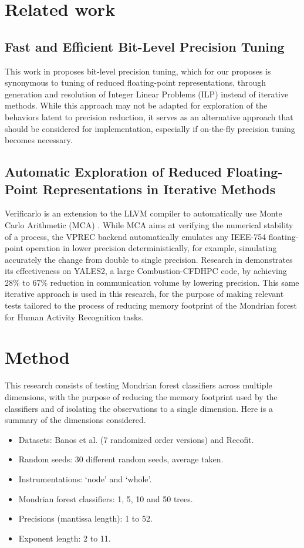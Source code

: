 \documentclass[conference]{IEEEtran}
\begin{document}
\section{Related work}
\subsection{Fast and Efficient Bit-Level Precision Tuning}
This work in \cite{adje2021fast} proposes bit-level precision tuning, which for our proposes is synonymous to tuning of reduced floating-point representations, through generation and resolution of Integer Linear Problems (ILP) instead of iterative methods. While this approach may not be adapted for exploration of the behaviors latent to precision reduction, it serves as an alternative approach that should be considered for implementation, especially if on-the-fly precision tuning becomes necessary.
\subsection{Automatic Exploration of Reduced Floating-Point Representations in Iterative Methods}
Verificarlo is an extension to the LLVM compiler to automatically use Monte Carlo Arithmetic (MCA) \cite{denis2016verificarlo}. While MCA aims at verifying the numerical stability of a process, the VPREC backend automatically emulates any IEEE-754 floating-point operation in lower precision deterministically, for example, simulating accurately the change from double to single precision. Research in \cite{chatelain2019automatic} demonstrates its effectiveness on YALES2, a large Combustion-CFDHPC code, by achieving 28\% to 67\% reduction in communication volume by lowering precision. This same iterative approach is used in this research, for the purpose of making relevant tests tailored to the process of reducing memory footprint of the Mondrian forest for Human Activity Recognition tasks.
\section{Method}

This research consists of testing Mondrian forest classifiers across multiple dimensions, with the purpose of reducing the memory footprint used by the classifiers and of isolating the observations to a single dimension. Here is a summary of the dimensions considered.
\begin{itemize}
\item Datasets: Banos et al. (7 randomized order versions) and Recofit.
\item Random seeds: 30 different random seeds, average taken.
\item Instrumentations: ‘node’ and ‘whole’.
\item Mondrian forest classifiers: 1, 5, 10 and 50 trees.
\item Precisions (mantissa length): 1 to 52.
\item Exponent length: 2 to 11.
\end{itemize}
\end{document}
